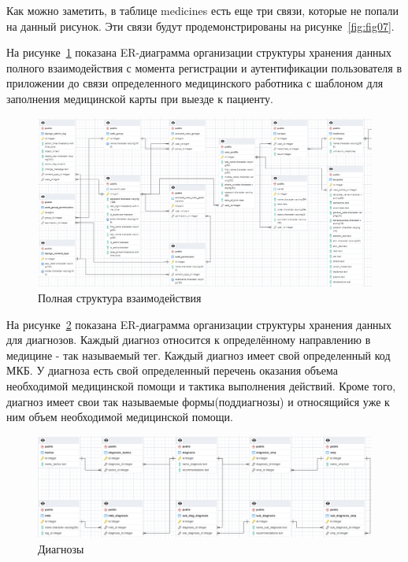 Как можно заметить, в таблице medicines есть еще три связи, которые не попали на данный рисунок. Эти связи будут продемонстрированы на рисунке~\ref{fig:fig07}.

На рисунке~\ref{fig:fig04} показана ER-диаграмма организации структуры хранения данных полного взаимодействия с момента регистрации и аутентификации пользователя в приложении до связи определенного медицинского работника с шаблоном для заполнения медицинской карты при выезде к пациенту.

\begin{figure}
  \includegraphics[scale=0.418]{inc/django_user_profile}
  \caption{Полная структура взаимодействия}
  \label{fig:fig04}
\end{figure}

На рисунке~\ref{fig:fig05} показана ER-диаграмма организации структуры хранения данных для диагнозов. Каждый диагноз относится к определённому направлению в медицине - так называемый тег. Каждый диагноз имеет свой определенный код МКБ. У диагноза есть свой определенный перечень оказания объема необходимой медицинской помощи и тактика выполнения действий. Кроме того, диагноз имеет свои так называемые формы(поддиагнозы) и относящийся уже к ним объем необходимой медицинской помощи.

\begin{figure}
  \includegraphics[scale=0.354]{inc/diagnosis}
  \caption{Диагнозы}
  \label{fig:fig05}
\end{figure}

